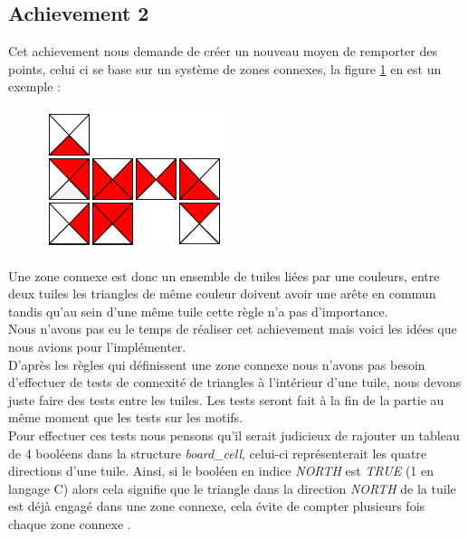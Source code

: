 \documentclass[11pt]{article}
\begin{document}
\subsection{Achievement 2}
Cet achievement nous demande de créer un nouveau moyen de remporter des points, celui ci se base sur un système de zones connexes, la figure \ref{fig : zone} en est un exemple :

\begin{figure}[H] 
\centering
\includegraphics[scale=0.5]{zones connexes.png}
\label{fig : zone}
\end{figure}

Une zone connexe est donc un ensemble de tuiles liées par une couleurs, entre deux tuiles les triangles de même couleur doivent avoir une arête en commun tandis qu'au sein d'une même tuile cette règle n'a pas d'importance. \\

Nous n'avons pas eu le temps de réaliser cet achievement mais voici les idées que nous avions pour l'implémenter. \\

D'après les règles qui définissent une zone connexe nous n'avons pas besoin d'effectuer de tests de connexité de triangles à l'intérieur d'une tuile, nous devons juste faire des tests entre les tuiles. Les tests seront fait à la fin de la partie au même moment que les tests sur les motifs. \\

Pour effectuer ces tests nous pensons qu'il serait judicieux de rajouter un tableau de 4 booléens dans la structure \emph{board\_cell}, celui-ci représenterait les quatre directions d'une tuile. Ainsi, si le booléen en indice \emph{NORTH} est \emph{TRUE} (1 en langage C) alors cela signifie que le triangle dans la direction \emph{NORTH} de la tuile est déjà engagé dans une zone connexe, cela évite de compter plusieurs fois chaque zone connexe .\\
\end{document}
